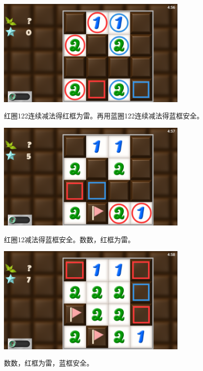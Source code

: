 \subsection{} %
\begin{center}
    \includegraphics[width=0.7\textwidth]{puzzle/56-1.png}
\end{center}
红圈122连续减法得红框为雷。再用蓝圈122连续减法得蓝框安全。
\begin{center}
    \includegraphics[width=0.7\textwidth]{puzzle/56-2.png}
\end{center}
红圈12减法得蓝框安全。数数，红框为雷。
\begin{center}
    \includegraphics[width=0.7\textwidth]{puzzle/56-3.png}
\end{center}
数数，红框为雷，蓝框安全。

